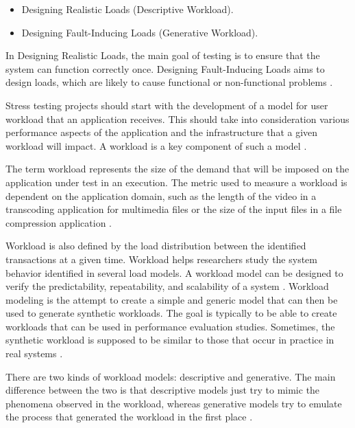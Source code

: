 \documentclass{report}
\begin{document}
\begin{itemize}
\item Designing Realistic Loads (Descriptive Workload). 
\item Designing Fault-Inducing Loads (Generative Workload).
\end{itemize}

In Designing Realistic Loads, the main goal of testing is to ensure that the system can function correctly once. Designing Fault-Inducing Loads  aims to design loads, which are likely to cause functional or non-functional problems \cite{Afzal2009a}.

Stress testing projects should start with the development of a model for user workload that an application receives. This should take into consideration various performance aspects of the application and the infrastructure that a given workload will impact. A workload is a key component of such a model \cite{Molyneaux2009}.

The term workload represents the size of the demand that will be imposed on the application under test in an execution. The metric  used to measure a workload is dependent on the application domain, such as the length of the video in a transcoding application for multimedia files or the size of the input files in a file compression application \cite{Feitelson2013} \cite{Molyneaux2009} \cite{Goncalves2014}. 

Workload is also defined by the load distribution between the identified transactions at a given time. Workload helps researchers study the system behavior identified in several load models. A workload model can be designed to verify the predictability, repeatability, and scalability of a system \cite{Feitelson2013} \cite{Molyneaux2009}. Workload modeling is the attempt to create a simple and generic model that can then be used to generate synthetic workloads. The goal is typically to be able to create workloads that can be used in performance evaluation studies. Sometimes, the synthetic workload is supposed to be similar to those that occur in practice in real systems \cite{Feitelson2013} \cite{Molyneaux2009}.

There are two kinds of workload models: descriptive and generative. The main difference between the two is that descriptive models just try to mimic the phenomena observed in the workload, whereas generative models try to emulate the process that generated the workload in the first place \cite{Feitelson2013}. 
\end{document}
